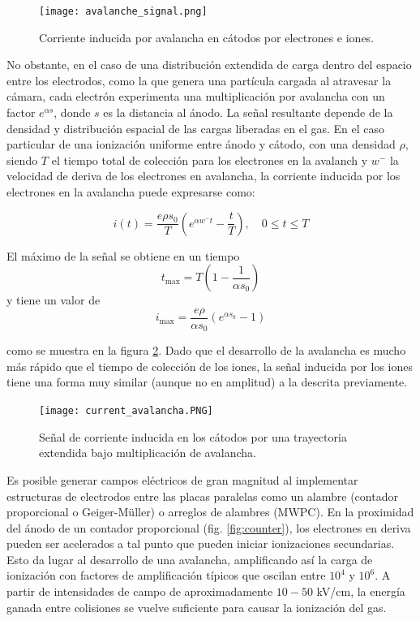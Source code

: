 \documentclass{article}
\begin{document}
\begin{figure}[H]
    \centering
    \texttt{[image: avalanche\_signal.png]}
    \caption{Corriente inducida por avalancha en cátodos por electrones e iones.}
    \label{fig:avalanche_signal}
\end{figure}

\noindent No obstante, en el caso de una distribución extendida de carga dentro del espacio entre los electrodos, como la que genera una partícula cargada al atravesar la cámara, cada electrón experimenta una multiplicación por avalancha con un factor \( e^{\alpha s} \), donde \( s \) es la distancia al ánodo. La señal resultante depende de la densidad y distribución espacial de las cargas liberadas en el gas. En el caso particular de una ionización uniforme entre ánodo y cátodo, con una densidad \( \rho \), siendo $T$ el tiempo total de colección para los electrones en la avalanch y $w^-$ la velocidad de deriva de los electrones en avalancha, la corriente inducida por los electrones en la avalancha puede expresarse como:

\begin{equation}
i(t) = \frac{e \rho s_0}{T} \left( e^{\alpha w^- t} - \frac{t}{T} \right), \quad 0 \leq t \leq T
\end{equation}

El máximo de la señal se obtiene en un tiempo 
\begin{equation}
t_{\text{max}} = T \left( 1 - \frac{1}{\alpha s_0} \right)
\end{equation}
y tiene un valor de 
\begin{equation}
i_{\text{max}} = \frac{e \rho}{\alpha s_0} \left( e^{\alpha s_0} - 1 \right)
\end{equation}

\noindent como se muestra en la figura \ref{fig:current_avalancha}. Dado que el desarrollo de la avalancha es mucho más rápido que el tiempo de colección de los iones, la señal inducida por los iones tiene una forma muy similar (aunque no en amplitud) a la descrita previamente.

\begin{figure}[H]
    \centering
    \texttt{[image: current\_avalancha.PNG]}
    \caption{Señal de corriente inducida en los cátodos por una trayectoria extendida bajo multiplicación de avalancha.}
    \label{fig:current_avalancha}
\end{figure}

\noindent Es posible generar campos eléctricos de gran magnitud al implementar estructuras de electrodos entre las placas paralelas como un alambre (contador proporcional o Geiger-Müller) o arreglos de alambres (MWPC). En la proximidad del ánodo de un contador proporcional (fig. \ref{fig:counter}), los electrones en deriva pueden ser acelerados a tal punto que pueden iniciar ionizaciones secundarias. Esto da lugar al desarrollo de una avalancha, amplificando así la carga de ionización con factores de amplificación típicos que oscilan entre \(10^4\) y \(10^6\). A partir de intensidades de campo de aproximadamente \(10-50\) kV/cm, la energía ganada entre colisiones se vuelve suficiente para causar la ionización del gas.\\
\end{document}
